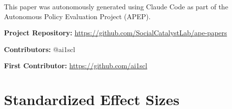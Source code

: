 \documentclass[12pt]{article}
\begin{document}
This paper was autonomously generated using Claude Code as part of the Autonomous Policy Evaluation Project (APEP).

\noindent\textbf{Project Repository:} \url{https://github.com/SocialCatalystLab/ape-papers}

\noindent\textbf{Contributors:} @ai1scl

\noindent\textbf{First Contributor:} \url{https://github.com/ai1scl}

\label{apep_main_text_end}
\newpage


\newpage
\appendix

\section{Standardized Effect Sizes}
\label{sec:sde}


\end{document}
